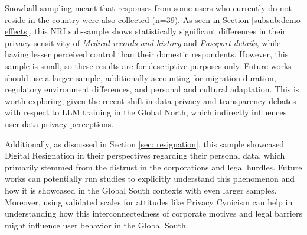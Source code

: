 Snowball sampling meant that responses from some users who currently do not reside in the country were also collected (n=39). As seen in Section \ref{subsub:demo effects}, this NRI sub-sample shows statistically significant differences in their privacy sensitivity of \textit{Medical records and history} and \textit{Passport details}, while having lesser perceived control than their domestic respondents. However, this sample is small, so these results are for descriptive purposes only. Future works should use a larger sample, additionally accounting for migration duration, regulatory environment differences, and personal and cultural adaptation. This is worth exploring, given the recent shift in data privacy \cite{edpb2024opinion} and transparency \cite{eu2024aiact} debates with respect to LLM training in the Global North, which indirectly influences user data privacy perceptions.  

Additionally, as discussed in Section \ref{sec: resignation}, this sample showcased Digital Resignation in their perspectives regarding their personal data, which primarily stemmed from the distrust in the corporations and legal hurdles. Future works can potentially run studies to explicitly understand this phenomenon and how it is showcased in the Global South contexts with even larger samples. Moreover, using validated scales for attitudes like Privacy Cynicism \cite{hoffmann_privacy_2016, lutz_data_2020} can help in understanding how this interconnectedness of corporate motives and legal barriers might influence user behavior in the Global South.  